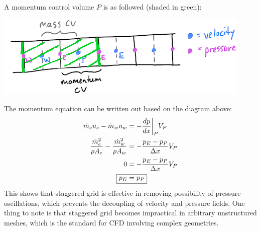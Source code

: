 \documentclass[11pt]{article}
\begin{document}
A momentum control volume \(P\) is as followed (shaded in green): 
\begin{center}
\includegraphics[scale=0.8]{pic/staggered_1d_momentum.png}
\end{center}
The momentum equation can be written out based on the diagram above:
\begin{equation*}
\begin{aligned}
\dot{m}_e u_e - \dot{m}_wu_w &= -\frac{dp}{dx}\biggr\rvert_P V_P\\
\frac{\dot{m}_e^2}{\rho A_e} - \frac{\dot{m}_w^2}{\rho A_w} &= -\frac{p_E - p_P}{\Delta x} V_P\\
0 &= -\frac{p_E - p_P}{\Delta x} V_P\\
\Aboxed{p_E &= p_P}
\end{aligned}
\end{equation*}
This shows that staggered grid is effective in removing possibility of pressure oscillations, which prevents
the decoupling of velocity and pressure fields. One thing to note is that staggered grid becomes impractical
in arbitrary unstructured meshes, which is the standard for CFD involving complex geometries.
\end{document}
